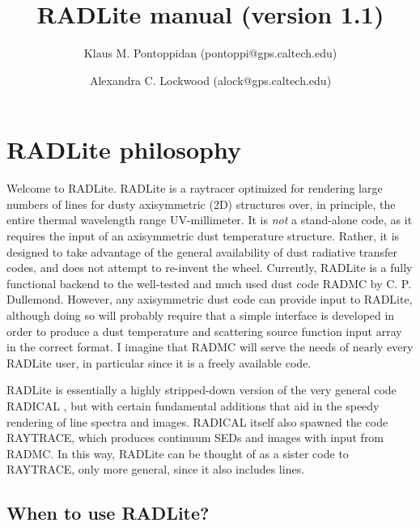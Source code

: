\documentclass[11pt]{article}
\begin{document}
\title{RADLite manual (version 1.1)}
\author{Klaus M. Pontoppidan (pontoppi@gps.caltech.edu)}
\author{Alexandra C. Lockwood (alock@gps.caltech.edu)}

\maketitle

\section{RADLite philosophy}

Welcome to RADLite. RADLite is a raytracer optimized for rendering large numbers of lines for dusty axisymmetric (2D) structures over, in principle, the entire
thermal wavelength range UV-millimeter.  It is {\it not} a stand-alone code, as it requires the input of an axisymmetric dust temperature structure. 
Rather, it is designed to take advantage of the general availability of dust radiative transfer codes, and does not attempt to re-invent the wheel. 
Currently, RADLite is a fully functional backend to the well-tested and much used dust code RADMC by C. P. Dullemond. However, any axisymmetric 
dust code can provide input to RADLite, although doing so will probably require that a simple interface is developed in order to produce a dust temperature and scattering source function input array in the correct format. I imagine that RADMC will serve the needs of nearly every RADLite user, in particular since it is a freely available code. 

RADLite is essentially a highly stripped-down version of the very general code RADICAL \citep{Dullemond00}, but with certain fundamental
additions that aid in the speedy rendering of line spectra and images. RADICAL itself also spawned the code RAYTRACE, which produces
continuum SEDs and images with input from RADMC. In this way, RADLite can be thought of as a sister code to RAYTRACE, only more general, since it
also includes lines.  

\subsection{When to use RADLite?}
\end{document}

